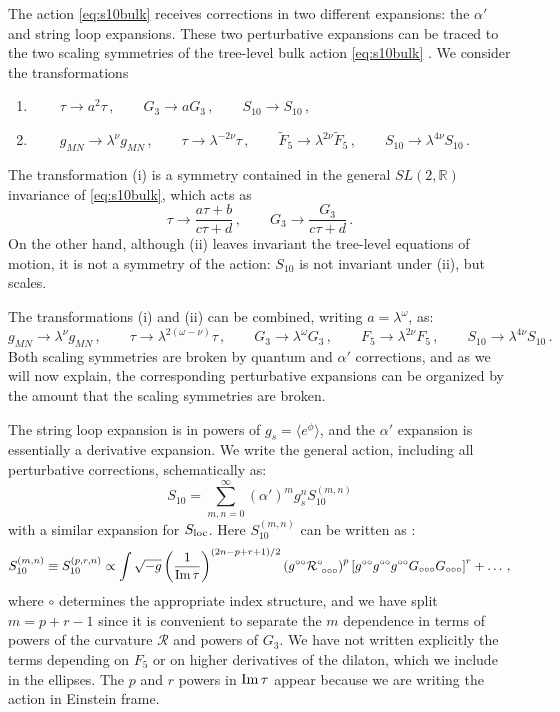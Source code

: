 \documentclass[12pt,a4wide]{article}
\def\be{\begin{equation}}
\def\ee{\end{equation}}
\def\R{\mathcal{R}}
\begin{document}
The action \eqref{eq:s10bulk} receives corrections in two different expansions: the $\alpha'$ and string loop expansions. 
These two perturbative expansions can be traced to 
the 
two scaling symmetries of the tree-level bulk action \eqref{eq:s10bulk} \cite{Burgess:2020qsc,Cicoli:2021rub}.
We consider the transformations 
\begin{enumerate}[label=(\roman*)]
\item $\qquad\tau \rightarrow a^2 \tau\,, \qquad G_3\rightarrow a G_3\,,\qquad S_{10}\rightarrow S_{10}$\,,
\item $\qquad g_{MN}\rightarrow \lambda^\nu g_{MN}\,,\qquad \tau\rightarrow \lambda^{-2\nu}\tau\,, \qquad \tilde{F}_5\rightarrow \lambda^{2\nu}\tilde{F}_5\,, \qquad S_{10}\rightarrow \lambda^{4\nu}S_{10}$\,.
\end{enumerate}
The transformation (i) is a symmetry contained in
the general $SL(2,\mathbb{R})$ invariance of \eqref{eq:s10bulk}, which acts as
\begin{equation}
  \tau\rightarrow \frac{a\tau+b}{c\tau+d}\,, \qquad G_3\rightarrow \frac{G_3}{c\tau+d}\,.
\end{equation}
On the other hand, although (ii) leaves invariant the tree-level equations of motion, it is not a symmetry of the action: $S_{10}$ is not invariant under (ii), but scales.

The transformations (i) and (ii) can be combined, writing $a=\lambda^\omega$, as:
\be
 g_{MN}\rightarrow \lambda^\nu  g_{MN}\,,\qquad \tau\rightarrow \lambda^{2(\omega-\nu)}\tau\,, \qquad G_3\rightarrow \lambda^{\omega}G_3\,, \qquad F_5\rightarrow \lambda^{2\nu}F_5\,, \qquad S_{10}\rightarrow \lambda^{4\nu}S_{10}\,.
\ee
Both scaling  symmetries are broken by quantum and $\alpha'$ corrections, and as we will now explain, the corresponding perturbative expansions can be organized
by the amount that the scaling symmetries are broken. 

The string loop expansion is in powers of $g_s=\langle e^{\phi}\rangle$, and the $\alpha'$ expansion is essentially a derivative expansion. 
We write the general action, including all perturbative corrections, schematically as: 
\be
S_{10}=\sum_{m,n=0}^\infty (\alpha')^m g_s^n S_{10}^{(m,n)}
\ee
with a similar expansion for $S_{\rm loc}$. Here $S_{10}^{(m,n)} $ can be written as \cite{Burgess:2020qsc}:
\be
S_{10}^{(m,n)}\equiv S_{10}^{(p,r,n)} 
\propto \int  \sqrt{-g} \left( \frac{1}{\hbox{Im}\, \tau} \right)^{(2n-p+r+1)/2} \left({g}^{\circ \circ} \R^\circ_{~\circ \circ\circ} \right)^{p}  \left[ {g}^{\circ \circ}  {g}^{\circ \circ}  {g}^{\circ \circ} G_{\circ\circ\circ} G_{\circ\circ\circ} \right]^r +\ldots\,,  
\label{Smn}
\ee
where $\circ$ determines the appropriate index structure, and we have split $m=p+r-1$ since it is convenient to separate the $m$ dependence in terms of powers of the curvature $\R$ and powers of $G_3$. We have not written explicitly the terms depending on $F_5$ or on higher derivatives of the dilaton, which we include in the ellipses. The $p$ and $r$ powers in $\hbox{Im}\,\tau$ appear because we are writing the action in Einstein frame.
 
\end{document}

